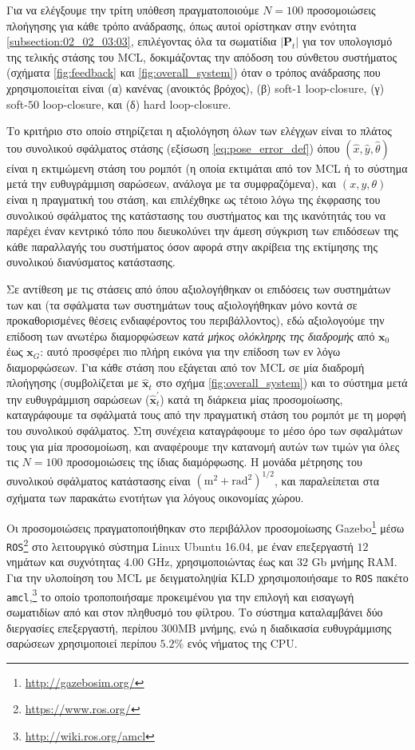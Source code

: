 Για να ελέγξουμε την τρίτη υπόθεση πραγματοποιούμε $N=100$ προσομοιώσεις
πλοήγησης για κάθε τρόπο ανάδρασης, όπως αυτοί ορίστηκαν στην ενότητα
\ref{subsection:02_02_03:03}, επιλέγοντας όλα τα σωματίδια $|\bm{P}_t|$ για τον
υπολογισμό της τελικής στάσης του MCL, δοκιμάζοντας την απόδοση του σύνθετου
συστήματος (σχήματα \ref{fig:feedback} και \ref{fig:overall_system}) όταν ο
τρόπος ανάδρασης που χρησιμοποιείται είναι (α) κανένας (ανοικτός βρόχος), (β)
soft-$1$ loop-closure, (γ) soft-$50$ loop-closure, και (δ) hard loop-closure.

Το κριτήριο στο οποίο στηρίζεται η αξιολόγηση όλων των ελέγχων είναι το πλάτος
του συνολικού σφάλματος στάσης (εξίσωση \ref{eq:pose_error_def}) όπου
$(\hat{x}, \hat{y}, \hat{\theta})$ είναι η εκτιμώμενη στάση του ρομπότ (η οποία
εκτιμάται από τον MCL ή το σύστημα μετά την ευθυγράμμιση σαρώσεων, ανάλογα με
τα συμφραζόμενα), και $(x,y,\theta)$ είναι η πραγματική του στάση, και
επιλέχθηκε ως τέτοιο λόγω της έκφρασης του συνολικού σφάλματος της κατάστασης
του συστήματος και της ικανότητάς του να παρέχει έναν κεντρικό τόπο που
διευκολύνει την άμεση σύγκριση των επιδόσεων της κάθε παραλλαγής του συστήματος
όσον αφορά στην ακρίβεια της εκτίμησης της συνολικού διανύσματος κατάστασης.

Σε αντίθεση με τις στάσεις από όπου αξιολογήθηκαν οι επιδόσεις των συστημάτων
των \cite{Rowekamper2012a} και \cite{Vasiljevic2016a} (τα σφάλματα των
συστημάτων τους αξιολογήθηκαν μόνο κοντά σε προκαθορισμένες θέσεις
ενδιαφέροντος του περιβάλλοντος), εδώ αξιολογούμε την επίδοση των ανωτέρω
διαμορφώσεων \textit{κατά μήκος ολόκληρης της διαδρομής} από $\bm{x}_0$ έως
$\bm{x}_G$: αυτό προσφέρει πιο πλήρη εικόνα για την επίδοση των εν λόγω
διαμορφώσεων.  Για κάθε στάση που εξάγεται από τον MCL σε μία διαδρομή
πλοήγησης (συμβολίζεται με $\hat{\bm{x}}_t$ στο σχήμα \ref{fig:overall_system})
και το σύστημα μετά την ευθυγράμμιση σαρώσεων ($\hat{\bm{x}}^{\prime}_t$) κατά
τη διάρκεια μίας προσομοίωσης, καταγράφουμε τα σφάλματά τους από την πραγματική
στάση του ρομπότ με τη μορφή του συνολικού σφάλματος. Στη συνέχεια καταγράφουμε
το μέσο όρο των σφαλμάτων τους για μία προσομοίωση, και αναφέρουμε την κατανομή
αυτών των τιμών για όλες τις $N = 100$ προσομοιώσεις της ίδιας διαμόρφωσης. Η
μονάδα μέτρησης του συνολικού σφάλματος κατάστασης είναι
$(\text{m}^2+\text{rad}^2)^{1/2}$, και παραλείπεται στα σχήματα των παρακάτω
ενοτήτων για λόγους οικονομίας χώρου.

Οι προσομοιώσεις πραγματοποιήθηκαν στο περιβάλλον προσομοίωσης
Gazebo\footnote{\url{http://gazebosim.org/}} μέσω
\texttt{ROS}\footnote{\url{https://www.ros.org/}} στο λειτουργικό σύστημα Linux
Ubuntu 16.04, με έναν επεξεργαστή $12$ νημάτων και συχνότητας $4.00$ GHz,
χρησιμοποιώντας έως και $32$ Gb μνήμης RAM. Για την υλοποίηση του MCL με
δειγματοληψία KLD χρησιμοποιήσαμε το \texttt{ROS} πακέτο
\texttt{amcl},\footnote{\url{http://wiki.ros.org/amcl}} το οποίο τροποποιήσαμε
προκειμένου για την επιλογή και εισαγωγή σωματιδίων από και στον πληθυσμό του
φίλτρου. Το σύστημα καταλαμβάνει δύο διεργασίες επεξεργαστή, περίπου 300MB
μνήμης, ενώ η διαδικασία ευθυγράμμισης σαρώσεων χρησιμοποιεί περίπου $5.2\%$
ενός νήματος της CPU.


